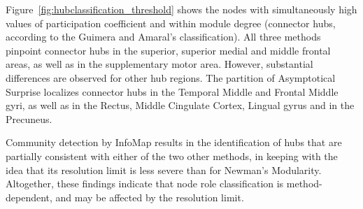 Figure~\ref{fig:hubclassification_threshold} shows the nodes with simultaneously high values of participation coefficient and within module degree (connector hubs, according to the Guimera and Amaral's classification).
All three methods pinpoint connector hubs in the superior, superior medial and middle frontal areas, as well as in the supplementary motor area.
However, substantial differences are observed for other hub regions.
The partition of Asymptotical Surprise localizes connector hubs in the Temporal Middle and Frontal Middle gyri, as well as in the Rectus, Middle Cingulate Cortex, Lingual gyrus and in the Precuneus.

Community detection by InfoMap results in the identification of hubs that are partially consistent with either of the two other methods, in keeping with the idea that its resolution limit is less severe than for Newman's Modularity.
Altogether, these findings indicate that node role classification is method-dependent, and may be affected by the resolution limit.


